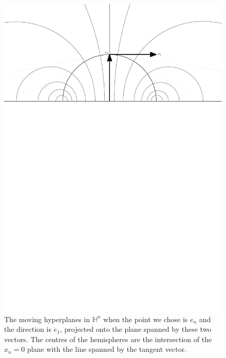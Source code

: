 \begin{figure}
	\centering
	\includegraphics[width=\textwidth]{figures/5b_moving_planes_hyperbolic}
	\caption{The moving hyperplanes in $\mathbb{H}^n$ when the point we chose is $e_n$ and the direction is $e_1$, projected onto the plane spanned by these two vectors. The centres of the hemispheres are the intersection of the $x_n=0$ plane with the line spanned by the tangent vector.}
	\label{moving hyperplanes hyperbolic}
\end{figure}

